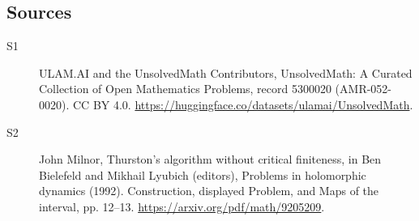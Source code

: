 \documentclass[11pt]{article}
\begin{document}
\subsection{Sources}
\begin{description}
\item[\hypertarget{source:5300020:1}{S1}] ULAM.AI and the UnsolvedMath Contributors, UnsolvedMath: A Curated Collection of Open Mathematics Problems, record 5300020 (AMR-052-0020). CC BY 4.0. \url{https://huggingface.co/datasets/ulamai/UnsolvedMath}.
\item[\hypertarget{source:5300020:2}{S2}] John Milnor, Thurston’s algorithm without critical finiteness, in Ben Bielefeld and Mikhail Lyubich (editors), Problems in holomorphic dynamics (1992). Construction, displayed Problem, and Maps of the interval, pp. 12–13. \url{https://arxiv.org/pdf/math/9205209}.
\end{description}
\label{end:5300020}
\end{document}

